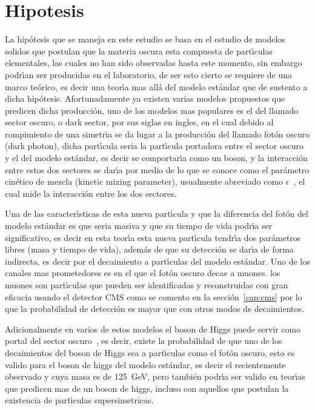 \chapter{Hipotesis}

La hip\'otesis que se maneja en este estudio se basa en el estudio de modelos solidos que postulan que la materia oscura esta compuesta de part\'{\i}culas elementales, las cuales no han sido observadas hasta este momento, sin embargo podr\'{\i}an ser producidas en el laboratorio, de ser esto cierto se requiere de una marco te\'orico, es decir una teor\'{\i}a mas all\'a del modelo est\'andar que de sustento a dicha hip\'otesis. Afortunadamente ya existen varias modelos propuestos que predicen dicha producci\'on, uno de los modelos mas populares es el del llamado sector oscuro, o dark sector, por sus siglas en ingles, en el cual debido al rompimiento de una simetr\'{\i}a se da lugar a la producci\'on del llamado fot\'on oscuro (dark photon), dicha part\'{\i}cula seria la part\'{\i}cula portadora entre el sector oscuro y el del modelo est\'andar, es decir se comportar\'{\i}a como un boson, y la interacci\'on entre estos dos sectores se dar\'{\i}a por medio de lo que se conoce como el par\'ametro cin\'etico de mezcla (kinetic mixing parameter), usualmente abreviado como $\epsilon$~\cite{LB}, el cual mide la interacci\'on entre los dos sectores.

Una de las caracter\'{\i}sticas de esta nueva part\'{\i}cula y que la diferencia del fot\'on del modelo est\'andar es que seria masiva y que su tiempo de vida podr\'{\i}a ser significativo, es decir en esta teor\'{\i}a esta nueva part\'{\i}cula tendr\'{\i}a dos par\'ametros libres (masa y tiempo de vida), adem\'as de que su detecci\'on se dar\'{\i}a de forma indirecta, es decir por el decaimiento a part\'{\i}culas del modelo est\'andar.  Uno de los canales mas prometedores es en el que el fot\'on oscuro decae a muones. los muones son part\'{\i}culas que pueden ser identificadas y reconstruidas con gran eficacia usando el detector CMS como se comento en la secci\'on~\ref{cap:cms} por lo que la probabilidad de detecci\'on es mayor que con otros modos de decaimientos.

Adicionalmente en varios de estos modelos el boson de Higgs puede servir como portal del sector oscuro~\cite{Arcadi:2019lka}, es decir, existe la probabilidad de que uno de los decaimientos del boson de Higgs sea a part\'{\i}culas como el fot\'on oscuro, esto es valido para el boson de higgs del modelo est\'andar, es decir el recientemente observado y cuya masa es de 125~GeV, pero tambi\'en podr\'{\i}a ser valido en teor\'{\i}as que predicen mas de un boson de higgs, incluso con aquellos que postulan la existencia de part\'{\i}culas supersimetricas.




